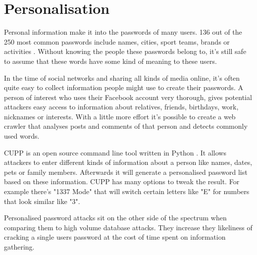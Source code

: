 \section{Personalisation}

Personal information make it into the passwords of many users. 136 out of the 250 most common passwords include names, cities, sport teams, brands or activities \cite{seclist}. Without knowing the people these passwords belong to, it's still safe to assume that these words have some kind of meaning to these users.

In the time of social networks and sharing all kinds of media online, it's often quite easy to collect information people might use to create their passwords. A person of interest who uses their Facebook account very thorough, gives potential attackers easy access to information about relatives, friends, birthdays, work, nicknames or interests. With a little more effort it's possible to create a web crawler that analyses posts and comments of that person and detects commonly used words.

CUPP is an open source command line tool written in Python \cite{cupp}. It allows attackers to enter different kinds of information about a person like names, dates, pets or family members. Afterwards it will generate a personalised password list based on these information. CUPP has many options to tweak the result. For example there's "1337 Mode" that will switch certain letters like "E" for numbers that look similar like "3".

Personalised password attacks sit on the other side of the spectrum when comparing them to high volume database attacks. They increase they likeliness of cracking a single users password at the cost of time spent on information gathering.

\newpage